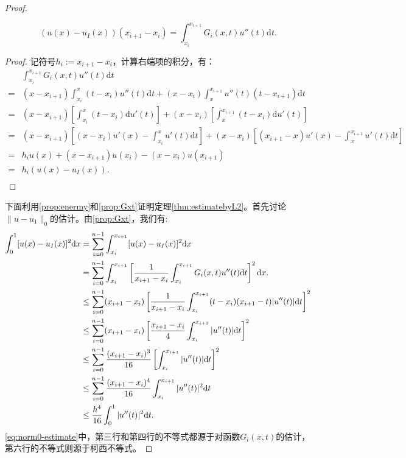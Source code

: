 \documentclass[lang=cn,10pt,newtx]{elegantbook}
\newcommand{\dif}{\mathrm{d}}
\newcommand{\norm}[1]{\|#1\|}
\begin{document}
\begin{proof}
\begin{proposition}
\begin{equation}
    (u(x)-u_{I}(x))(x_{i+1}-x_{i})=\int_{x_{i}}^{x_{i+1}}G_{i}(x,t)u''(t)\dif t.
  \end{equation}
\end{proposition}
\begin{proof}
  记符号$h_{i}:=x_{i+1}-x_{i}$，计算右端项的积分，有：
  \begin{equation}
    \begin{aligned}
      &\int_{x_{i}}^{x_{i+1}}G_{i}(x,t)u''(t)\dif t\\
      =&(x-x_{i+1})\int_{x_{i}}^{x}(t-x_{i})u''(t)\dif t+(x-x_{i})\int_{x}^{x_{i+1}}u''(t)(t-x_{i+1})\dif t\\
      =&(x-x_{i+1})\left[\int_{x_{i}}^{x}(t-x_{i})\dif u'(t)\right]+(x-x_{i})\left[\int_{x}^{x_{i+1}}(t-x_{i})\dif u'(t)\right]\\
      =&(x-x_{i+1})\left[(x-x_{i})u'(x)-\int_{x_{i}}^{x}u'(t)\dif t\right]+(x-x_{i})\left[(x_{i+1}-x)u'(x)-\int_{x}^{x_{i+1}}u'(t)\dif t\right]\\
      =&h_{i}u(x)+(x-x_{i+1})u(x_{i})-(x-x_{i})u(x_{i+1})\\
      =&h_{i}(u(x)-u_{I}(x)).\\
    \end{aligned}
  \end{equation}
  \end{proof}
  下面利用\ref{prop:enermy}和\ref{prop:Gxt}证明定理\ref{thm:estimatebyL2}。首先讨论$\norm{u-u_{1}}_{0}$的估计。由\ref{prop:Gxt}，我们有:
  \begin{equation}
    \label{eq:norm0-estimate}
    \begin{aligned}
      \int_{0}^{1}[u(x)-u_{I}(x)]^{2}\dif x&=\sum_{i=0}^{n-1}\int_{x_{i}}^{x_{i+1}}[u(x)-u_{I}(x)]^{2}\dif x\\
      &=\sum_{i=0}^{n-1}\int_{x_{i}}^{x_{i+1}}\left[\frac{1}{x_{i+1}-x_{i}}\int_{x_{i}}^{x_{i+1}}G_{i}(x,t)u''(t)\dif t\right]^{2}\dif x.\\
      &\le\sum_{i=0}^{n-1}(x_{i+1}-x_{i})\left[\frac{1}{x_{i+1}-x_{i}}\int_{x_{i}}^{x_{i+1}}(t-x_{i})(x_{i+1}-t)|u''(t)|\dif t\right]^{2}\\
      &\le\sum_{i=0}^{n-1}(x_{i+1}-x_{i})\left[\frac{x_{i+1}-x_{i}}{4}\int_{x_{i}}^{x_{i+1}}|u''(t)|\dif t\right]^{2}\\
      &\le\sum_{i=0}^{n-1}\frac{(x_{i+1}-x_{i})^{3}}{16}\left[\int_{x_{i}}^{x_{i+1}}|u''(t)|\dif t\right]^{2}\allowdisplaybreaks[4]\\
      &\le\sum_{i=0}^{n-1}\frac{(x_{i+1}-x_{i})^{4}}{16}\int_{x_{i}}^{x_{i+1}}|u''(t)|^{2}\dif t\\
      &\le\frac{h^4}{16}\int_{0}^{1}|u''(t)|^{2}\dif t.
    \end{aligned}
  \end{equation}
  \eqref{eq:norm0-estimate}中，第三行和第四行的不等式都源于对函数$G_{i}(x,t)$的估计，第六行的不等式则源于柯西不等式。
  

\end{proof}
\end{document}
